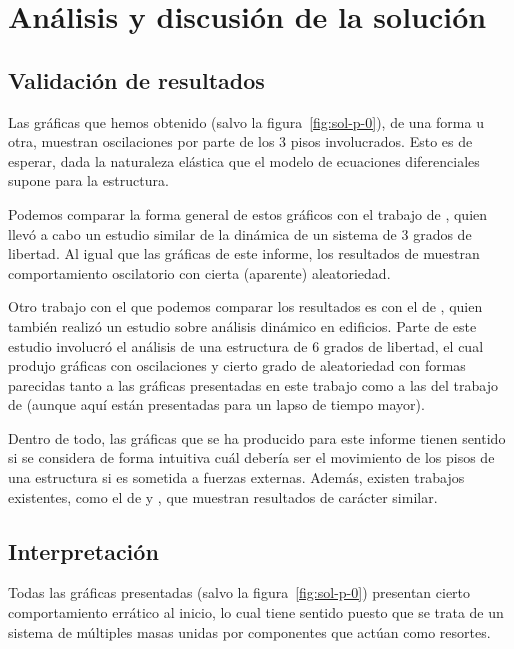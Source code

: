 \section{Análisis y discusión de la solución}

\subsection{Validación de resultados}

Las gráficas que hemos obtenido (salvo la figura~\ref{fig:sol-p-0}), de una forma u otra, muestran oscilaciones por parte de los 3 pisos involucrados. Esto es de esperar, dada la naturaleza elástica que el modelo de ecuaciones diferenciales supone para la estructura.

Podemos comparar la forma general de estos gráficos con el trabajo de \citet{hernandez}, quien llevó a cabo un estudio similar de la dinámica de un sistema de 3 grados de libertad. Al igual que las gráficas de este informe, los resultados de \citet{hernandez} muestran comportamiento oscilatorio con cierta (aparente) aleatoriedad.

Otro trabajo con el que podemos comparar los resultados es con el de \citet{garcia}, quien también realizó un estudio sobre análisis dinámico en edificios. Parte de este estudio involucró el análisis de una estructura de 6 grados de libertad, el cual produjo gráficas con oscilaciones y cierto grado de aleatoriedad con formas parecidas tanto a las gráficas presentadas en este trabajo como a las del trabajo de \citet{hernandez} (aunque aquí están presentadas para un lapso de tiempo mayor).

Dentro de todo, las gráficas que se ha producido para este informe tienen sentido si se considera de forma intuitiva cuál debería ser el movimiento de los pisos de una estructura si es sometida a fuerzas externas. Además, existen trabajos existentes, como el de \citet{hernandez} y \citet{garcia}, que muestran resultados de carácter similar.


\subsection{Interpretación}

Todas las gráficas presentadas (salvo la figura~\ref{fig:sol-p-0}) presentan cierto comportamiento errático al inicio, lo cual tiene sentido puesto que se trata de un sistema de múltiples masas unidas por componentes que actúan como resortes.

